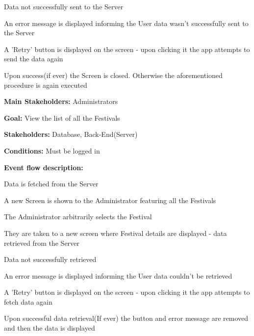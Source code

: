 \begin{packed_item}
\begin{packed_item}
						\item[3.a] Data not successfully sent to the Server
						\item[] \begin{packed_enum}
							\item An error message is displayed informing the User data wasn't successfully sent to the Server
							\item A 'Retry' button is displayed on the screen - upon clicking it the app attempts to send the data again
							\item Upon success(if ever) the Screen is closed. Otherwise the aforementioned procedure is again executed
						\end{packed_enum}
					\end{packed_item}
				\end{packed_item}
					

				\noindent {}
				\begin{packed_item}
					\item \textbf{Main Stakeholders:} Administrators
					\item \textbf{Goal:} View the list of all the Festivals
					\item \textbf{Stakeholders: } Database, Back-End(Server)
					\item \textbf{Conditions: } Must be logged in
					\item \textbf{Event flow description: }
					\begin{packed_enum}
						\item Data is fetched from the Server
						\item A new Screen is shown to the Administrator featuring all the Festivals
						\item The Administrator arbitrarily selects the Festival
						\item They are taken to a new screen where Festival details are displayed - data retrieved from the Server
					\end{packed_enum}
					
					\begin{packed_item}
						\item[1.a, 4.a] Data not successfully retrieved
						\item[] \begin{packed_enum}
							\item An error message is displayed informing the User data couldn't be retrieved
							\item A 'Retry' button is displayed on the screen - upon clicking it the app attempts to fetch data again
							\item Upon successful data retrieval(If ever) the button and error message are removed and then the data is displayed
						\end{packed_enum}
					\end{packed_item}
				\end{packed_item}				
			
